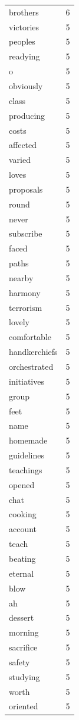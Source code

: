 \begin{tabular}{lr}
brothers & 6 \\
victories & 5 \\
peoples & 5 \\
readying & 5 \\
o & 5 \\
obviously & 5 \\
class & 5 \\
producing & 5 \\
costs & 5 \\
affected & 5 \\
varied & 5 \\
loves & 5 \\
proposals & 5 \\
round & 5 \\
never & 5 \\
subscribe & 5 \\
faced & 5 \\
paths & 5 \\
nearby & 5 \\
harmony & 5 \\
terrorism & 5 \\
lovely & 5 \\
comfortable & 5 \\
handkerchiefs & 5 \\
orchestrated & 5 \\
initiatives & 5 \\
group & 5 \\
feet & 5 \\
name & 5 \\
homemade & 5 \\
guidelines & 5 \\
teachings & 5 \\
opened & 5 \\
chat & 5 \\
cooking & 5 \\
account & 5 \\
teach & 5 \\
beating & 5 \\
eternal & 5 \\
blow & 5 \\
ah & 5 \\
dessert & 5 \\
morning & 5 \\
sacrifice & 5 \\
safety & 5 \\
studying & 5 \\
worth & 5 \\
oriented & 5 \\

\end{tabular}
